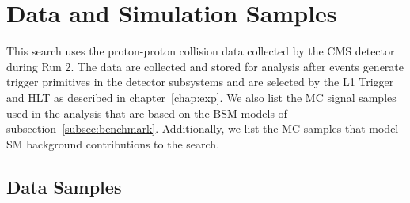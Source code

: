 
\section{Data and Simulation Samples}
\label{sec:samples}

This search uses the proton-proton collision data collected by the CMS detector during Run 2.
The data are collected and stored for analysis after events generate trigger primitives in the detector subsystems and are selected by the L1 Trigger and HLT as described in chapter~\ref{chap:exp}.
We also list the MC signal samples used in the analysis that are based on the BSM models of subsection~\ref{subsec:benchmark}.
Additionally, we list the MC samples that model SM background contributions to the search.

\subsection{Data Samples}

